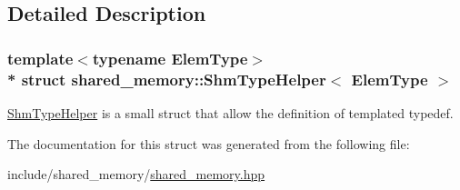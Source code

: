 \subsection{Detailed Description}
\subsubsection*{template$<$typename Elem\+Type$>$\\*
struct shared\+\_\+memory\+::\+Shm\+Type\+Helper$<$ Elem\+Type $>$}

\hyperlink{structshared__memory_1_1ShmTypeHelper}{Shm\+Type\+Helper} is a small struct that allow the definition of templated typedef. 

The documentation for this struct was generated from the following file\+:\begin{DoxyCompactItemize}
\item 
include/shared\+\_\+memory/\hyperlink{shared__memory_8hpp}{shared\+\_\+memory.\+hpp}\end{DoxyCompactItemize}
